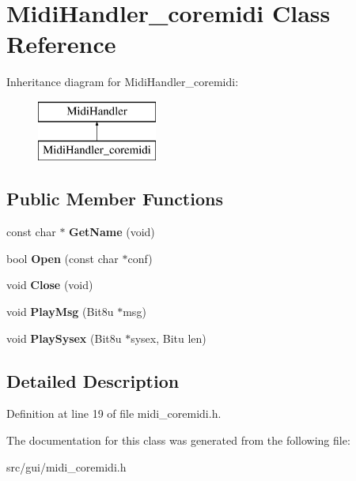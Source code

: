 \hypertarget{classMidiHandler__coremidi}{\section{Midi\-Handler\-\_\-coremidi Class Reference}
\label{classMidiHandler__coremidi}
}
Inheritance diagram for Midi\-Handler\-\_\-coremidi\-:\begin{figure}[H]
\begin{center}
\leavevmode
\includegraphics[height=2.000000cm]{classMidiHandler__coremidi}
\end{center}
\end{figure}
\subsection*{Public Member Functions}
\begin{DoxyCompactItemize}
\item 
\hypertarget{classMidiHandler__coremidi_a12a752957ce570d615f9df36004a62d4}{const char $\ast$ {\bfseries Get\-Name} (void)}\label{classMidiHandler__coremidi_a12a752957ce570d615f9df36004a62d4}

\item 
\hypertarget{classMidiHandler__coremidi_a5be85c4448a39ac81517aa9d2f5bc40a}{bool {\bfseries Open} (const char $\ast$conf)}\label{classMidiHandler__coremidi_a5be85c4448a39ac81517aa9d2f5bc40a}

\item 
\hypertarget{classMidiHandler__coremidi_a2b77595d41ee029730f899ef600cc954}{void {\bfseries Close} (void)}\label{classMidiHandler__coremidi_a2b77595d41ee029730f899ef600cc954}

\item 
\hypertarget{classMidiHandler__coremidi_aa8800f78e52ead18fbff1809cccaafa2}{void {\bfseries Play\-Msg} (Bit8u $\ast$msg)}\label{classMidiHandler__coremidi_aa8800f78e52ead18fbff1809cccaafa2}

\item 
\hypertarget{classMidiHandler__coremidi_a3da6325a06d609d99a5eb1586ecf4318}{void {\bfseries Play\-Sysex} (Bit8u $\ast$sysex, Bitu len)}\label{classMidiHandler__coremidi_a3da6325a06d609d99a5eb1586ecf4318}

\end{DoxyCompactItemize}


\subsection{Detailed Description}


Definition at line 19 of file midi\-\_\-coremidi.\-h.



The documentation for this class was generated from the following file\-:\begin{DoxyCompactItemize}
\item 
src/gui/midi\-\_\-coremidi.\-h\end{DoxyCompactItemize}
